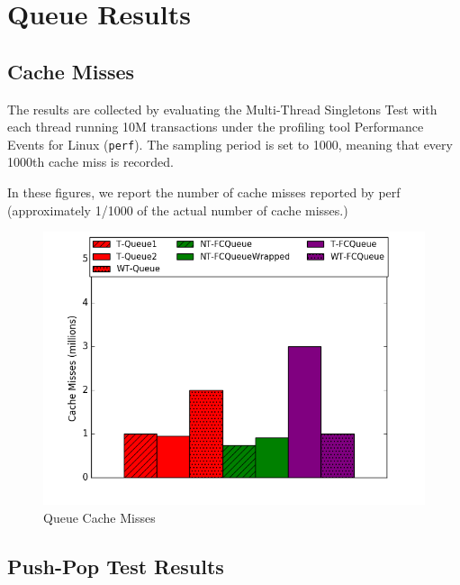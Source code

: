 \chapter{Queue Results}
\label{app:queue}

\section{Cache Misses}

The results are collected by evaluating the Multi-Thread Singletons Test with each thread running 10M transactions under the profiling tool Performance Events for Linux (\texttt{perf}). The sampling period is set to 1000, meaning that every 1000th cache miss is recorded.

In these figures, we report the number of cache misses reported by perf (approximately 1/1000 of the actual number of cache misses.)

\begin{figure}[H]
    \centering
    \includegraphics[width=\textwidth]{fcqueues/cm.png}
    \caption{Queue Cache Misses}
\label{fig:cm_queues}
\end{figure}

\section{Push-Pop Test Results}
\label{app:queue_pp}

